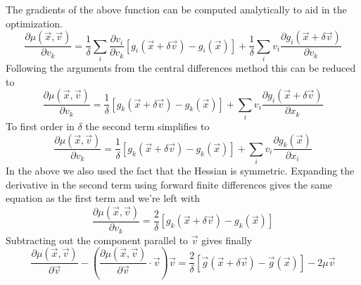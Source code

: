 \documentclass[a4paper]{article}
\begin{document}
The gradients of the above function can be computed analytically to aid in the
optimization.
\begin{equation}
\frac{\partial \mu(\vec{x}, \vec{v})} {\partial v_k} = 
\frac{1}{\delta} 
\sum_i \frac{\partial v_i}{\partial v_k}
\left[ g_i(\vec{x} + \delta \vec{v}) 
- g_i(\vec{x}) \right]
+
\frac{1}{\delta} 
\sum_i v_i
\frac{\partial g_i(\vec{x} + \delta \vec{v})}{\partial v_k} 
\end{equation}
Following the arguments from the central differences method this can be reduced to
\begin{equation}
\frac{\partial \mu(\vec{x}, \vec{v})} {\partial v_k} = 
\frac{1}{\delta} 
\left[ g_k(\vec{x} + \delta \vec{v}) 
- g_k(\vec{x}) \right]
+
\sum_i v_i
\frac{\partial g_i(\vec{x} + \delta \vec{v})}{\partial x_k} 
\end{equation}
To first order in $\delta$ the second term simplifies to
\begin{equation}
\frac{\partial \mu(\vec{x}, \vec{v})} {\partial v_k} = 
\frac{1}{\delta} 
\left[ g_k(\vec{x} + \delta \vec{v}) 
- g_k(\vec{x}) \right]
+
\sum_i v_i
\frac{\partial g_k(\vec{x})}{\partial x_i} 
\end{equation}
In the above we also used the fact that the Hessian is symmetric.
Expanding the derivative in the second term using forward finite differences
gives the same equation as the first term and we're left with
\begin{equation}
\frac{\partial \mu(\vec{x}, \vec{v})} {\partial v_k} = 
\frac{2}{\delta} 
\left[ g_k(\vec{x} + \delta \vec{v}) 
- g_k(\vec{x}) \right]
\end{equation}
Subtracting out the component parallel to $\vec{v}$ gives finally
\begin{equation}
\frac{\partial \mu(\vec{x}, \vec{v})} {\partial \vec{v}} - 
\left(
\frac{\partial \mu(\vec{x}, \vec{v})} {\partial \vec{v}} \cdot \vec{v}
\right) \vec{v}
= 
\frac{2}{\delta} 
\left[ \vec{g}(\vec{x} + \delta \vec{v}) 
- \vec{g}(\vec{x}) \right]
-
2 \mu \vec{v}
\end{equation}
\end{document}
